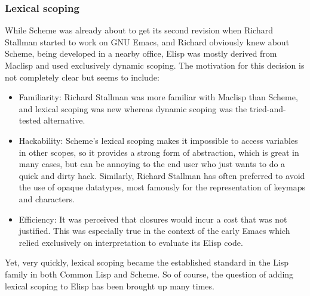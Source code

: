 \documentclass[format=acmsmall, review=false, screen=true]{acmart}
\newcommand \Elisp {Elisp}
\begin{document}

\subsubsection{Lexical scoping}

While Scheme was already about to get its second revision when Richard
Stallman started to work on GNU Emacs, and Richard obviously knew about
Scheme, being developed in a nearby office, \Elisp{} was mostly derived from
Maclisp and used exclusively dynamic scoping.  The motivation for this
decision is not completely clear but seems to include:
\begin{itemize}
\item Familiarity: Richard Stallman was more familiar with Maclisp than Scheme, and
  lexical scoping was new whereas dynamic scoping was the
  tried-and-tested alternative.
\item Hackability: Scheme's lexical scoping makes it impossible to access
  variables in other scopes, so it provides a strong form of abstraction,
  which is great in many cases, but can be annoying to the end user who just
  wants to do a quick and dirty hack.
  Similarly, Richard Stallman has often
  preferred to avoid the use of opaque datatypes, most famously for the
  representation of keymaps and characters.
\item Efficiency: It was perceived that closures would incur a cost that was
  not justified.  This was especially true in the context of the early Emacs
  which relied exclusively on interpretation to evaluate its \Elisp{} code.
\end{itemize}
Yet, very quickly, lexical scoping became the established standard in
the Lisp family in both Common Lisp and Scheme.
So of course, the question of adding lexical scoping to \Elisp{} has been
brought up many times.
\end{document}
